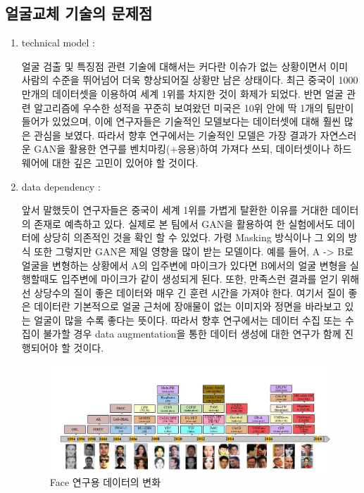 \documentclass{oblivoir}
\begin{document}
\subsection{얼굴교체 기술의 문제점}
\begin{enumerate}
    \item technical model : 

    얼굴 검출 및 특징점 관련 기술에 대해서는 커다란 이슈가 없는 상황이면서 이미 사람의 수준을 뛰어넘어 더욱 향상되어질 상황만 남은 상태이다. 최근 중국이 1000만개의 데이터셋을 이용하여 세계 1위를 차지한 것이 화제가 되었다. 반면 얼굴 관련 알고리즘에 우수한 성적을 꾸준히 보여왔던 미국은 10위 안에 딱 1개의 팀만이 들어가 있었으며, 이에 연구자들은 기술적인 모델보다는 데이터셋에 대해 훨씬 많은 관심을 보였다. 따라서 향후 연구에서는 기술적인 모델은 가장 결과가 자연스러운 GAN을 활용한 연구를 벤치마킹(+응용)하여 가져다 쓰되, 데이터셋이나 하드웨어에 대한 깊은 고민이 있어야 할 것이다.

    \item data dependency : 

    앞서 말했듯이 연구자들은 중국이 세계 1위를 가볍게 탈환한 이유를 거대한 데이터의 존재로 예측하고 있다. 실제로 본 팀에서 GAN을 활용하여 한 실험에서도 데이터에 상당히 의존적인 것을 확인 할 수 있었다. 가령 Masking 방식이나 그 외의 방식 또한 그렇지만 GAN은 제일 영향을 많이 받는 모델이다. 예를 들어, A -> B로 얼굴을 변형하는 상황에서 A의 입주변에 마이크가 있다면 B에서의 얼굴 변형을 실행할때도 입주변에 마이크가 같이 생성되게 된다. 또한, 만족스런 결과를 얻기 위해선 상당수의 질이 좋은 데이터와 매우 긴 훈련 시간을 가져야 한다. 여기서 질이 좋은 데이터란 기본적으로 얼굴 근처에 장애물이 없는 이미지와 정면을 바라보고 있는 얼굴이 많을 수록 좋다는 뜻이다. 따라서 향후 연구에서는 데이터 수집 또는 수집이 불가할 경우 data augmentation을 통한 데이터 생성에 대한 연구가 함께 진행되어야 할 것이다.

    \begin{figure}[h!]
        \centering
          \includegraphics{pic/chp1/img669}
        \caption{Face 연구용 데이터의 변화 \cite{reference6}}
    \end{figure}


\end{enumerate}
\end{document}
